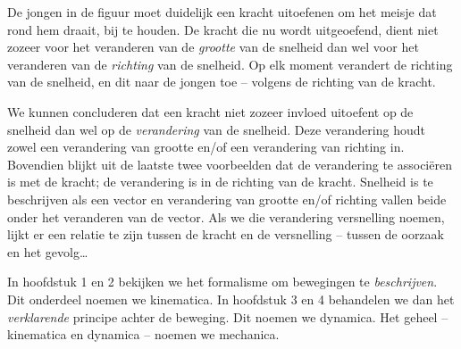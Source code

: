 \documentclass{ximera}
\begin{document}
De jongen in de figuur moet duidelijk een kracht uitoefenen om het meisje dat rond hem draait, bij te houden. De kracht die nu wordt uitgeoefend, dient niet zozeer voor het veranderen van de \textit{grootte} van de snelheid dan wel voor het veranderen van de \textit{richting} van de snelheid. Op elk moment verandert de richting van de snelheid, en dit naar de jongen toe -- volgens de richting van de kracht.

We kunnen concluderen dat een kracht niet zozeer invloed uitoefent op de snelheid dan wel op de \textit{verandering} van de snelheid. Deze verandering houdt zowel een verandering van grootte en/of een verandering van richting in. Bovendien blijkt uit de laatste twee voorbeelden dat de verandering te associëren is met de kracht; de verandering is in de richting van de kracht. Snelheid is te beschrijven als een vector en verandering van grootte en/of richting vallen beide onder het veranderen van de vector. Als we die verandering versnelling noemen, lijkt er een relatie te zijn tussen de kracht en de versnelling -- tussen de oorzaak en het gevolg\ldots

In hoofdstuk 1 en 2 bekijken we het formalisme om bewegingen te \textit{beschrijven}. Dit onderdeel noemen we kinematica. In hoofdstuk 3 en 4 behandelen we dan het \textit{verklarende} principe achter de beweging. Dit noemen we dynamica. Het geheel -- kinematica en dynamica -- noemen we mechanica.
\end{document}
